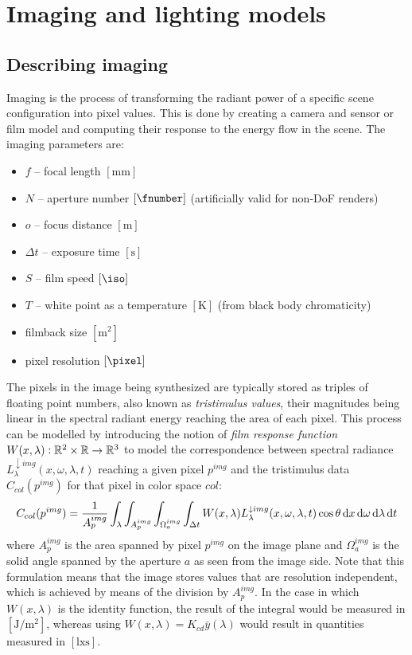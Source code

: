
\chapter{Imaging and lighting models}\label{ch:lighting}
\section{Describing imaging}\label{ch:imaging}

Imaging is the process of transforming the radiant power of a specific scene
configuration into pixel values. This is done by creating a camera and sensor
or film model and computing their response to the energy flow in the scene.
The imaging parameters are:
\begin{itemize}
\item $f$ -- focal length $[\unit{\milli\meter}]$
\item $N$ -- aperture number $[\unit{\fnumber}]$  (artificially valid for
non-DoF renders)
\item $o$ -- focus distance $[\unit{\meter}]$
\item $\Delta t$ -- exposure time $[\unit{\second}]$
\item $S$ -- film speed $[\unit{\iso}]$
\item $T$ -- white point as a temperature $[\unit{\kelvin}]$  (from black body
chromaticity)
\item filmback size $[\unit{\square\meter}]$
\item pixel resolution $[\unit{\pixel}]$
\end{itemize}

The pixels in the image being synthesized are typically stored as triples of
floating point numbers, also known as \textsl{tristimulus values}, their
magnitudes being linear in the spectral radiant energy reaching the area of each
pixel.
This process can be modelled by introducing the notion of \textsl{film response
function} $W(x,\lambda): \mathbb{R}^2\times\mathbb{R} \to \mathbb{R}^3$ to model the correspondence
between spectral radiance $L^{\downarrow img}_{\lambda}(x, \omega, \lambda, t)$
reaching a given pixel $p^{img}$ and the tristimulus data $C_{col}(p^{img})$ for
that pixel in color space $col$:
\begin{equation}\label{eqn:imaging1}
C_{col}(p^{img})  = \frac1{A_p^{img}}\int_{\lambda} \int_{A_p^{img}}
\int_{\Omega^{img}_a} \int_{\Delta t} W(x, \lambda) L^{\downarrow
img}_{\lambda}(x, \omega, \lambda, t) \cos\theta\mathop{}\!\mathrm{d} x\mathop{}\!\mathrm{d}\omega\mathop{}\!\mathrm{d}\lambda\mathop{}\!\mathrm{d} t
\end{equation}
where $A_p^{img}$ is the area spanned by pixel $p^{img}$ on the image plane and
$\Omega^{img}_a$ is the solid angle spanned by the aperture $a$ as seen from
the image side.
Note that this formulation means that the image stores values that are
resolution independent, which is achieved by means of the division by
$A_p^{img}$. In the case in which $W(x, \lambda)$ is the identity function, the
result of the integral would be measured in $[\unit{\joule\per\square\meter}]$,
whereas using $W(x, \lambda) = K_{cd} \bar y(\lambda)$ would result in quantities
measured in $[\unit{\lux\second}]$.

